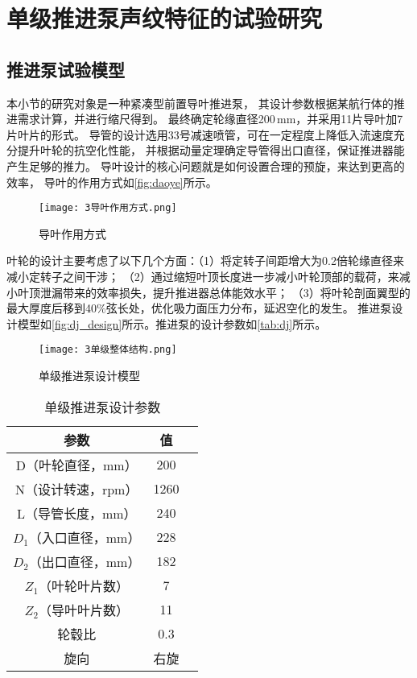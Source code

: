 \section{单级推进泵声纹特征的试验研究}
\subsection{推进泵试验模型}
本小节的研究对象是一种紧凑型前置导叶推进泵，
其设计参数根据某航行体的推进需求计算，并进行缩尺得到。
最终确定轮缘直径200\,mm，并采用11片导叶加7片叶片的形式。
导管的设计选用33号减速喷管，可在一定程度上降低入流速度充分提升叶轮的抗空化性能，
并根据动量定理确定导管得出口直径，保证推进器能产生足够的推力。
导叶设计的核心问题就是如何设置合理的预旋，来达到更高的效率，
导叶的作用方式如\autoref{fig:daoye}所示。
\begin{figure}[htbp]
    \centering
    \texttt{[image: 3导叶作用方式.png]}
    \caption{\label{fig:daoye}导叶作用方式}
\end{figure}

叶轮的设计主要考虑了以下几个方面：（1）将定转子间距增大为0.2倍轮缘直径来减小定转子之间干涉；
（2）通过缩短叶顶长度进一步减小叶轮顶部的载荷，来减小叶顶泄漏带来的效率损失，提升推进器总体能效水平；
（3）将叶轮剖面翼型的最大厚度后移到40\%弦长处，优化吸力面压力分布，延迟空化的发生。
推进泵设计模型如\autoref{fig:dj_design}所示。推进泵的设计参数如\autoref{tab:dj}所示。
\begin{figure}[htbp]
    \centering
    \texttt{[image: 3单级整体结构.png]}
    \caption{\label{fig:dj_design}单级推进泵设计模型}
\end{figure}
\begin{table}[htbp]
    \centering
    \caption{\label{tab:dj}单级推进泵设计参数}
    \begin{tabular}{ccc}
     \toprule
     参数&值\\
     \midrule
     D（叶轮直径，mm）&200\\
     N（设计转速，rpm）&1260\\
     L（导管长度，mm）&240\\
     $D_1$（入口直径，mm）&228\\
     $D_2$（出口直径，mm）&182\\
     $Z_1$（叶轮叶片数）&7\\
     $Z_2$（导叶叶片数）&11\\
     轮毂比&0.3\\
     旋向&右旋\\
     \bottomrule
    \end{tabular}
\end{table}

